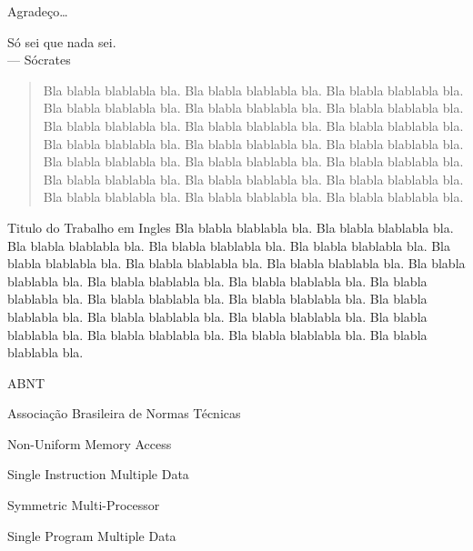 \documentclass[tese,capa]{texufpel}
\begin{document}
\begin{agradecimentos}
  Agradeço\ldots 
\end{agradecimentos}

\begin{epigrafe}
  Só sei que nada sei.\\
  {\sc --- Sócrates}
\end{epigrafe}

\begin{abstract}
Bla blabla blablabla bla.  Bla blabla blablabla bla.  Bla blabla
blablabla bla.  Bla blabla blablabla bla.  Bla blabla blablabla bla.
Bla blabla blablabla bla.  Bla blabla blablabla bla.  Bla blabla
blablabla bla.  Bla blabla blablabla bla.  Bla blabla blablabla bla.
Bla blabla blablabla bla.  Bla blabla blablabla bla.  Bla blabla
blablabla bla.  Bla blabla blablabla bla.  Bla blabla blablabla bla.
Bla blabla blablabla bla.  Bla blabla blablabla bla.  Bla blabla
blablabla bla.  Bla blabla blablabla bla.  Bla blabla blablabla bla.
Bla blabla blablabla bla.
\end{abstract}

\begin{englishabstract}{Titulo do Trabalho em Ingles}
Bla blabla blablabla bla.  Bla blabla blablabla bla.  Bla blabla
blablabla bla.  Bla blabla blablabla bla.  Bla blabla blablabla bla.
Bla blabla blablabla bla.  Bla blabla blablabla bla.  Bla blabla
blablabla bla.  Bla blabla blablabla bla.  Bla blabla blablabla bla.
Bla blabla blablabla bla.  Bla blabla blablabla bla.  Bla blabla
blablabla bla.  Bla blabla blablabla bla.  Bla blabla blablabla bla.
Bla blabla blablabla bla.  Bla blabla blablabla bla.  Bla blabla
blablabla bla.  Bla blabla blablabla bla.  Bla blabla blablabla bla.
Bla blabla blablabla bla.
\end{englishabstract}

\listoffigures

\listoftables

\begin{listofabbrv}{ABNT}%
        \item[ABNT] Associação Brasileira de Normas Técnicas
        \item[NUMA] Non-Uniform Memory Access
        \item[SIMD] Single Instruction Multiple Data
        \item[SMP] Symmetric Multi-Processor
        \item[SPMD] Single Program Multiple Data
\end{listofabbrv}
\end{document}
